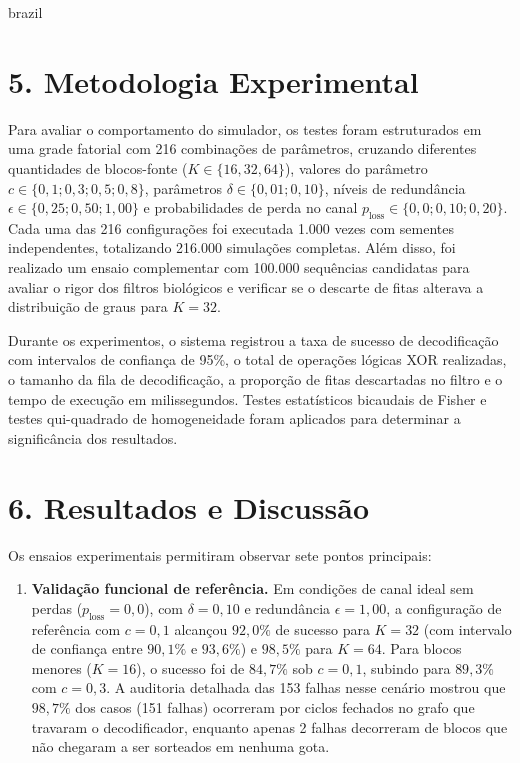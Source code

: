 \begin{resumo}
\begin{otherlanguage*}{brazil}
\section*{5. Metodologia Experimental}

Para avaliar o comportamento do simulador, os testes foram estruturados em uma grade fatorial com 216 combinações de parâmetros, cruzando diferentes quantidades de blocos-fonte ($K \in \{16, 32, 64\}$), valores do parâmetro $c \in \{0{,}1; 0{,}3; 0{,}5; 0{,}8\}$, parâmetros $\delta \in \{0{,}01; 0{,}10\}$, níveis de redundância $\epsilon \in \{0{,}25; 0{,}50; 1{,}00\}$ e probabilidades de perda no canal $p_{\text{loss}} \in \{0{,}0; 0{,}10; 0{,}20\}$. Cada uma das 216 configurações foi executada 1.000 vezes com sementes independentes, totalizando 216.000 simulações completas. Além disso, foi realizado um ensaio complementar com 100.000 sequências candidatas para avaliar o rigor dos filtros biológicos e verificar se o descarte de fitas alterava a distribuição de graus para $K=32$.

Durante os experimentos, o sistema registrou a taxa de sucesso de decodificação com intervalos de confiança de 95\%, o total de operações lógicas XOR realizadas, o tamanho da fila de decodificação, a proporção de fitas descartadas no filtro e o tempo de execução em milissegundos. Testes estatísticos bicaudais de Fisher e testes qui-quadrado de homogeneidade foram aplicados para determinar a significância dos resultados.

\section*{6. Resultados e Discussão}

Os ensaios experimentais permitiram observar sete pontos principais:
\begin{enumerate}
    \item \textbf{Validação funcional de referência.} Em condições de canal ideal sem perdas ($p_{\text{loss}} = 0{,}0$), com $\delta = 0{,}10$ e redundância $\epsilon = 1{,}00$, a configuração de referência com $c = 0{,}1$ alcançou $92{,}0\%$ de sucesso para $K = 32$ (com intervalo de confiança entre $90{,}1\%$ e $93{,}6\%$) e $98{,}5\%$ para $K = 64$. Para blocos menores ($K = 16$), o sucesso foi de $84{,}7\%$ sob $c = 0{,}1$, subindo para $89{,}3\%$ com $c = 0{,}3$. A auditoria detalhada das 153 falhas nesse cenário mostrou que $98{,}7\%$ dos casos (151 falhas) ocorreram por ciclos fechados no grafo que travaram o decodificador, enquanto apenas 2 falhas decorreram de blocos que não chegaram a ser sorteados em nenhuma gota.
    

\end{enumerate}
\end{otherlanguage*}
\end{resumo}
